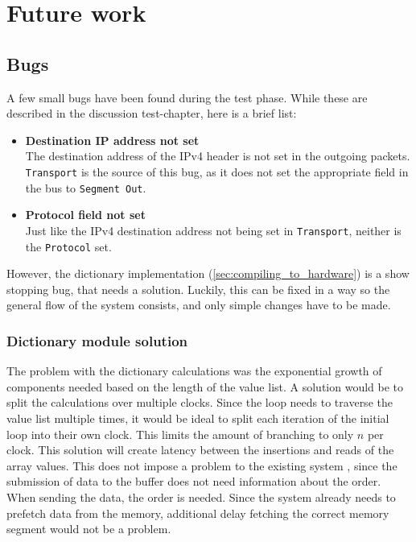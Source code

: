 \chapter{Future work}
\label{chap:future_work}

\section{Bugs}
A few small bugs have been found during the test phase. While these are
described in the discussion test-chapter, here is a brief list:
\begin{itemize}
	\item \textbf{Destination IP address not set}\\
	The destination address of the IPv4 header is not set in the outgoing
	packets. \texttt{Transport} is the source of this bug, as it does not
	set the appropriate field in the bus to \texttt{Segment Out}.

	\item \textbf{Protocol field not set}\\
		Just like the IPv4 destination address not being set in
		\texttt{Transport}, neither is the \texttt{Protocol} set.
\end{itemize}
However, the dictionary implementation (\autoref{sec:compiling_to_hardware})
is a show stopping bug, that needs a solution. Luckily, this can be fixed in
a way so the general flow of the system consists, and only simple changes have
to be made.

\subsection{Dictionary module solution}  \label{subsec:bug_dictionary_lookup}
The problem with the dictionary calculations was the exponential growth of
components needed based on the length of the value list. A solution would
be to split the calculations over multiple clocks. Since the loop needs to
traverse the value list multiple times, it would be ideal to split each iteration
of the initial loop into their own clock. This limits the amount of branching to
only $n$ per clock. This solution will create latency between the insertions and
reads of the array values. This does not impose a problem to the existing system
, since the submission of data to the buffer does not need information about the
order. When sending the data, the order is needed. Since the system already needs
 to prefetch data from the memory, additional delay fetching the correct memory
 segment would not be a problem.

